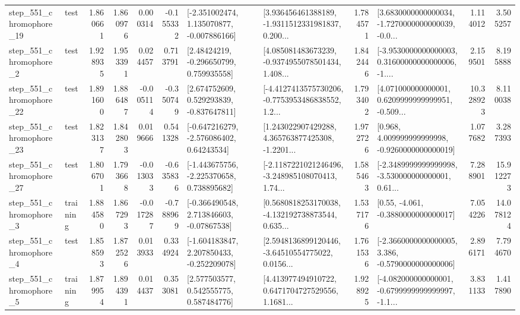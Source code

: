\begin{tabular}{llrrrrllrlrr}
  step\_551\_chromophore\_19 &      test &      1.860661 &    1.860976 &      0.000314 & -0.155332 &   [-2.351002474, 1.135070877, -0.007886166] &  [3.936456461388189, -1.9311512331981837, 0.200... &       1.784571 &  [3.6830000000000034, -1.7270000000000039, -0.0... &            1.114012 &          3.505257 \\
   step\_551\_chromophore\_2 &      test &      1.928935 &    1.953391 &      0.024457 &  0.713791 &     [2.48424219, -0.296650799, 0.759935558] &  [4.085081483673239, -0.9374955078501434, 1.408... &       1.842446 &  [-3.9530000000000003, 0.31600000000000006, -1.... &            2.159501 &          8.195888 \\
  step\_551\_chromophore\_22 &      test &      1.891600 &    1.886487 &     -0.005114 & -0.350749 &    [2.674752609, 0.529293839, -0.837647811] &  [-4.4127413575730206, -0.7753953486838552, 1.2... &       1.793402 &  [4.071000000000001, 0.6209999999999951, -0.509... &           10.328923 &          8.110038 \\
  step\_551\_chromophore\_23 &      test &      1.823137 &    1.842803 &      0.019666 &  0.541328 &    [-0.647216279, -2.576086402, 0.64243534] &  [1.243022907429288, 4.365763877425308, -1.2201... &       1.972726 &    [0.968, 4.009999999999998, -0.9260000000000019] &            1.077682 &          3.287393 \\
  step\_551\_chromophore\_27 &      test &      1.806701 &    1.793668 &     -0.013033 & -0.635836 &   [-1.443675756, -2.225370658, 0.738895682] &  [-2.1187221021246496, -3.248985108070413, 1.74... &       1.585463 &  [-2.3489999999999998, -3.530000000000001, 0.61... &            7.288901 &         15.912273 \\
   step\_551\_chromophore\_3 &  training &      1.884580 &    1.867293 &     -0.017287 & -0.788969 &    [-0.366490548, 2.713846603, -0.07867538] &  [0.5680818253170038, -4.132192738873544, 0.635... &       1.537176 &                [0.55, -4.061, -0.3880000000000017] &            7.054226 &         14.078124 \\
   step\_551\_chromophore\_4 &      test &      1.858593 &    1.872526 &      0.013933 &  0.334924 &   [-1.604183847, 2.207850433, -0.252209078] &  [2.5948136899120446, -3.64510554775022, 0.0156... &       1.761536 &  [-2.3660000000000005, 3.386, -0.5790000000000006] &            2.896171 &          7.794670 \\
   step\_551\_chromophore\_5 &  training &      1.879954 &    1.894391 &      0.014437 &  0.353081 &     [2.577503577, 0.542555775, 0.587484776] &  [4.413977494910722, 0.6471704727529556, 1.1681... &       1.928925 &  [-4.082000000000001, -0.6799999999999997, -1.1... &            3.831133 &          1.417890 \\

\end{tabular}
